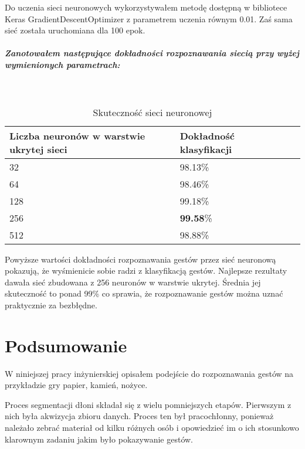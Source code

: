 \documentclass[a4paper,12pt,twoside,openany]{report}
\begin{document}
	Do uczenia sieci neuronowych wykorzystywałem metodę dostępną w bibliotece Keras GradientDescentOptimizer z parametrem uczenia równym 0.01. Zaś sama sieć została uruchomiana dla 100 epok. 
	
	\paragraph{Zanotowałem następujące dokładności rozpoznawania siecią przy wyżej wymienionych parametrach:}
	
	\mbox{}\\
	
	\begin{table}[H]
		\centering
		\begin{tabularx}{\textwidth}{|X|X|X|X|}
			\hline
			\textbf{Liczba neuronów w warstwie ukrytej sieci} & \textbf{Dokładność klasyfikacji} \\ 
			
			\hline
			32  & 98.13\% \\ 
			
			\hline
			64  & 98.46\% \\
			
			\hline
			128  & 99.18\% \\
			
			\hline
			256  & \textbf{99.58}\% \\
			
			\hline
			512  & 98.88\% \\
			
			\hline
		\end{tabularx}
		
		\caption{Skuteczność sieci neuronowej}
	\end{table}

	Powyższe wartości dokładności rozpoznawania gestów przez sieć neuronową pokazują, że wyśmienicie sobie radzi z klasyfikacją gestów. Najlepsze rezultaty dawała sieć zbudowana z 256 neuronów w warstwie ukrytej. Średnia jej skuteczność to ponad 99\% co sprawia, że rozpoznawanie gestów można uznać praktycznie za bezbłędne. 	

\chapter{Podsumowanie}
	W niniejszej pracy inżynierskiej opisałem podejście do rozpoznawania gestów na przykładzie gry papier, kamień, nożyce. 
	
	Proces segmentacji dłoni składał się z wielu pomniejszych etapów. Pierwszym z nich była akwizycja zbioru danych. Proces ten był pracochłonny, ponieważ należało zebrać materiał od kilku różnych osób i opowiedzieć im o ich stosunkowo klarownym zadaniu jakim było pokazywanie gestów. 
	
\end{document}
